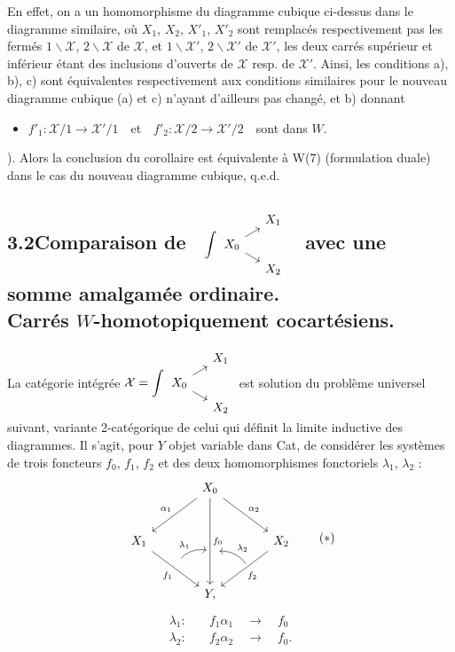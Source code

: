 \documentclass[11pt]{article}
\newcommand{\printedpage}[1]{\marginpar{\footnotesize p.~#1}}
\newcommand{\msp}[1]{\marginpar{\footnotesize [#1]}}
\newcommand{\cX}{\mathcal{X}}
\begin{document}
En effet, on a un homomorphisme du diagramme cubique ci-dessus dans le diagramme similaire, où $X_1$, $X_2$, $X'_1$, $X'_2$ sont remplacés respectivement pas les fermés %
$1\backslash\cX$, $2\backslash\cX$ de $\cX$, et $1\backslash\cX'$, $2\backslash\cX'$ de $\cX'$, les deux carrés supérieur et inférieur étant des inclusions d'ouverts de $\cX$ resp. de $\cX'$. Ainsi, les conditions a), b), c) sont équivalentes respectivement aux conditions similaires pour le nouveau diagramme cubique
\msp{page 128}
(a) et c) n'ayant d'ailleurs pas changé, et b) donnant
\begin{itemize}
\item[b$'$)] $f'_1 : \cX/1 \longrightarrow \cX'/1$\ \ et\ \ $f'_2 : \cX/2 \longrightarrow \cX'/2$\ \ sont dans $W$.
\end{itemize}
). Alors la conclusion du corollaire est équivalente à W(7) (formulation duale) dans le cas du nouveau diagramme cubique, q.e.d.

\subsection*{3.2\quad Comparaison de \ $\displaystyle\int
\begin{tikzcd}[column sep=small, row sep=tiny, ampersand replacement=\&, baseline=(\tikzcdmatrixname-2-1.base)]
 \& X_1 \\
X_0 \arrow[ur] \arrow[dr] \& \\
 \& X_2
\end{tikzcd}$ \ avec une somme amalgamée ordinaire.\\
Carrés $W$-homotopiquement cocartésiens.}

La catégorie intégrée $\cX = \displaystyle\int
\begin{tikzcd}[column sep=small, row sep=tiny, ampersand replacement=\&, baseline=(\tikzcdmatrixname-2-1.base)]
 \& X_1 \\
X_0 \arrow[ur] \arrow[dr] \& \\
 \& X_2
\end{tikzcd}$ est solution du problème universel suivant, variante 2-catégorique de celui qui définit la limite inductive des diagrammes. Il s'agit, pour $Y$ objet variable dans Cat, de considérer les systèmes de trois foncteurs $f_0$, $f_1$, $f_2$ et des deux homomorphismes fonctoriels $\lambda_1$, $\lambda_2$ :
\printedpage{87}
\[
\begin{tikzcd}[column sep=large, row sep=large, ampersand replacement=\&]
 \& X_0 \arrow[dl, "\alpha_1"'] \arrow[dr, "\alpha_2"] \arrow[dd, "f_0", ""{name=M, pos=0.62}] \& \\
X_1 \arrow[dr, "f_1"', ""{name=A, pos=0.45}] \& \& X_2 \arrow[dl, "f_2", ""{name=B, pos=0.45}] \\
 \& Y, \&
\arrow[from=A, to=M, bend left, shorten=3pt, "\lambda_1"]
\arrow[from=B, to=M, bend right, shorten=3pt, "\lambda_2"']
\end{tikzcd}
\tag*{$(*)$}
\]
\[
\begin{aligned}
\lambda_1 :\quad & f_1\alpha_1 \quad\longrightarrow\quad f_0\\
\lambda_2 :\quad & f_2\alpha_2 \quad\longrightarrow\quad f_0.
\end{aligned}
\]
\end{document}
